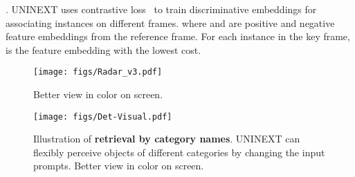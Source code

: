 \documentclass[10pt,twocolumn,letterpaper]{article}
\newcommand{\eqnnm}[2]{\ignorespaces}
\begin{document}
\underline{\bm{}}. UNINEXT uses contrastive loss~\cite{IDOL} to train discriminative embeddings for associating instances on different frames.
\eqnnm{loss_embed}{\mathcal{L}_\mathrm{embed} = \log [1+\sum_{\mathbf{k}^+}\sum_{\mathbf{k}^-}\exp(\mathbf{v} \cdot \mathbf{k}^-  - \mathbf{v} \cdot \mathbf{k}^+) ],}
where  and  are positive and negative feature embeddings from the reference frame. For each instance in the key frame,  is the feature embedding with the lowest cost.

\begin{figure}[!t]
  \begin{center}
\texttt{[image: figs/Radar\_v3.pdf]}
  \end{center}
  \vspace{-5mm}
\caption{Better view in color on screen.} \label{fig-radar}
\vspace{-3mm}
\end{figure}


\begin{figure*}[!t]
  \begin{center}
\texttt{[image: figs/Det-Visual.pdf]}
  \end{center}
  \vspace{-5mm}
\caption{Illustration of \textbf{retrieval by category names}. UNINEXT can flexibly perceive objects of different categories by changing the input prompts. Better view in color on screen.} 
  \label{fig-det-visual}
\vspace{-3mm}
\end{figure*}
\end{document}
